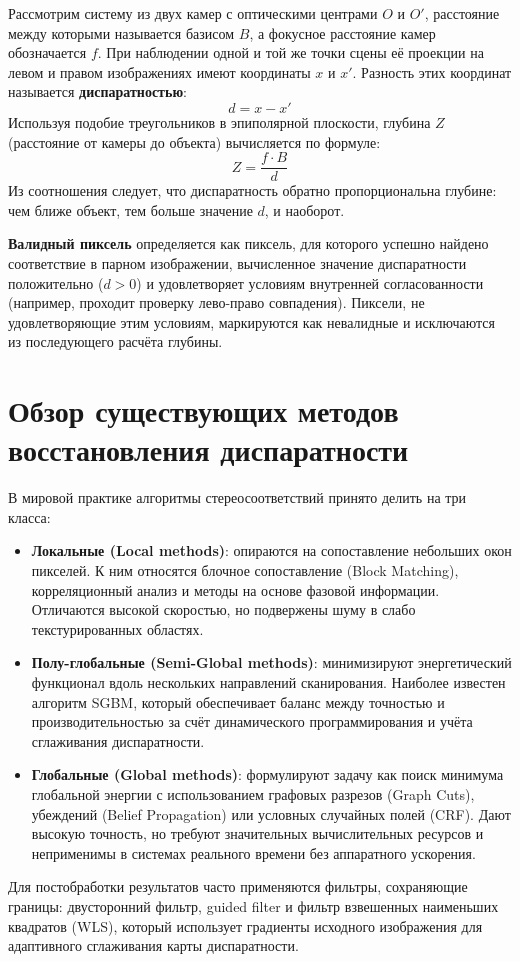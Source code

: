 	Рассмотрим систему из двух камер с оптическими центрами $O$ и $O'$, расстояние между которыми называется базисом $B$, а фокусное расстояние камер обозначается $f$. При наблюдении одной и той же точки сцены её проекции на левом и правом изображениях имеют координаты $x$ и $x'$. Разность этих координат называется \textbf{диспаратностью}:
	\[
	d = x - x'
	\]
	Используя подобие треугольников в эпиполярной плоскости, глубина $Z$ (расстояние от камеры до объекта) вычисляется по формуле:
	\[
	Z = \frac{f \cdot B}{d}
	\]
	Из соотношения следует, что диспаратность обратно пропорциональна глубине: чем ближе объект, тем больше значение $d$, и наоборот. 
	
	\textbf{Валидный пиксель} определяется как пиксель, для которого успешно найдено соответствие в парном изображении, вычисленное значение диспаратности положительно ($d > 0$) и удовлетворяет условиям внутренней согласованности (например, проходит проверку лево-право совпадения). Пиксели, не удовлетворяющие этим условиям, маркируются как невалидные и исключаются из последующего расчёта глубины.
	
	\section{Обзор существующих методов восстановления диспаратности}
	В мировой практике алгоритмы стереосоответствий принято делить на три класса:
	\begin{itemize}
		\item \textbf{Локальные (Local methods)}: опираются на сопоставление небольших окон пикселей. К ним относятся блочное сопоставление (Block Matching), корреляционный анализ и методы на основе фазовой информации. Отличаются высокой скоростью, но подвержены шуму в слабо текстурированных областях.
		\item \textbf{Полу-глобальные (Semi-Global methods)}: минимизируют энергетический функционал вдоль нескольких направлений сканирования. Наиболее известен алгоритм SGBM, который обеспечивает баланс между точностью и производительностью за счёт динамического программирования и учёта сглаживания диспаратности.
		\item \textbf{Глобальные (Global methods)}: формулируют задачу как поиск минимума глобальной энергии с использованием графовых разрезов (Graph Cuts), убеждений (Belief Propagation) или условных случайных полей (CRF). Дают высокую точность, но требуют значительных вычислительных ресурсов и неприменимы в системах реального времени без аппаратного ускорения.
	\end{itemize}
	Для постобработки результатов часто применяются фильтры, сохраняющие границы: двусторонний фильтр, guided filter и фильтр взвешенных наименьших квадратов (WLS), который использует градиенты исходного изображения для адаптивного сглаживания карты диспаратности.
	
